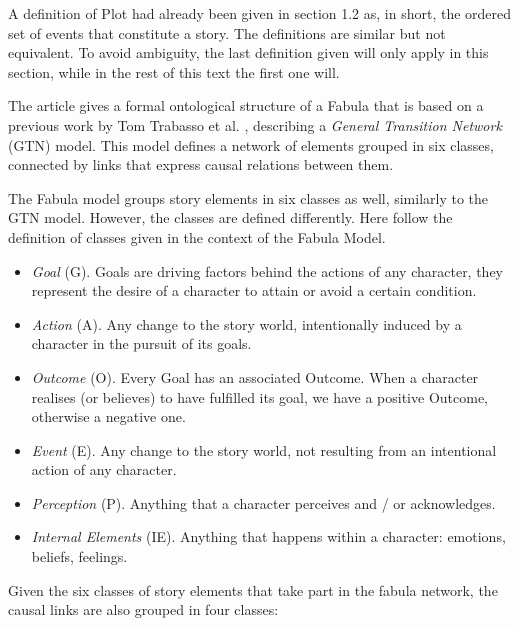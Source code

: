 \documentclass[12pt,a4paper,oneside]{report}
\begin{document}
A definition of Plot had already been given in section 1.2 as, in short, the ordered set of events that constitute a story. The definitions are similar but not equivalent. To avoid ambiguity, the last definition given will only apply in this section, while in the rest of this text the first one will.

The article gives a formal ontological structure of a Fabula that is based on a previous work by Tom Trabasso et al. \cite{trabasso89}, describing a \textit{General Transition Network} (GTN) model. This model defines a network of elements grouped in six classes, connected by links that express causal relations between them.

The Fabula model groups story elements in six classes as well, similarly to the GTN model. However, the classes are defined differently. Here follow the definition of classes given in the context of the Fabula Model.

\begin{itemize}\setlength{\itemsep}{0pt}
\item \textit{Goal} (G). Goals are driving factors behind the actions of any character, they represent the desire of a character to attain or avoid a certain condition.
\item \textit{Action} (A). Any change to the story world, intentionally induced by a character in the pursuit of its goals.
\item \textit{Outcome} (O). Every Goal has an associated Outcome. When a character realises (or believes) to have fulfilled its goal, we have a positive Outcome, otherwise a negative one.
\item \textit{Event} (E). Any change to the story world, not resulting from an intentional action of any character.
\item \textit{Perception} (P). Anything that a character perceives and / or acknowledges.
\item \textit{Internal Elements} (IE). Anything that happens within a character: emotions, beliefs, feelings.
\end{itemize}

Given the six classes of story elements that take part in the fabula network, the causal links are also grouped in four classes:
\end{document}
